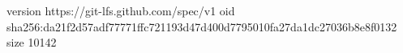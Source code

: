 version https://git-lfs.github.com/spec/v1
oid sha256:da21f2d57adf77771ffc721193d47d400d7795010fa27da1dc27036b8e8f0132
size 10142
